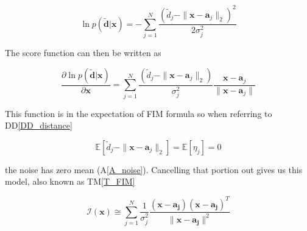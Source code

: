 \documentclass[12pt]{article}
\newcommand{\ddref}[1]{DD\ref{#1}}
\newcommand{\tref}[1]{TM\ref{#1}}
\newcommand{\aref}[1]{A\ref{#1}}
\begin{document}
\begin{displaymath}
  \ln p(\tilde{\mathbf{d}} | \mathbf{x}) = -\sum_{j=1}^{N} 
  \frac{(\tilde{d}_j - \|\mathbf{x} - \mathbf{a}_j\|_2)^2}{2\sigma_j^2}
\end{displaymath}

The score function can then be written as

\begin{displaymath}
  \frac{\partial \ln p(\tilde{\mathbf{d}} | \mathbf{x})}{\partial \mathbf{x}} = \sum_{j=1}^{N} 
  \frac{(\tilde{d}_j - \|\mathbf{x} - \mathbf{a}_j\|_2)}{\sigma_j^2}
  \frac{\mathbf{x} - \mathbf{a}_j}{\|\mathbf{x} - \mathbf{a}_j\|}
\end{displaymath}

This function is in the expectation of FIM formula so when referring to \ddref{DD_distance} 

\begin{displaymath}
  \mathbb{E} \left[ \tilde{d}_j - \|\mathbf{x} - \mathbf{a}_j\|_2 \right] 
= \mathbb{E} \left[ \eta_j \right] = 0
\end{displaymath}

the noise has zero mean (\aref{A_noise}). Cancelling that portion out gives us this model, also known as \tref{T_FIM}

\begin{displaymath}
  \boldsymbol{\mathcal{I}}(\mathbf{x}) \cong \sum_{j=1}^{N}\frac{1}{\sigma_j^2} \frac{\left(\mathbf{x}-\mathbf{a_j}\right) \left( \mathbf{x}-\mathbf{a_j}\right)^T}{\lVert \mathbf{x}-\mathbf{a_j} \rVert^2}
\end{displaymath}

~\newline
\end{document}
